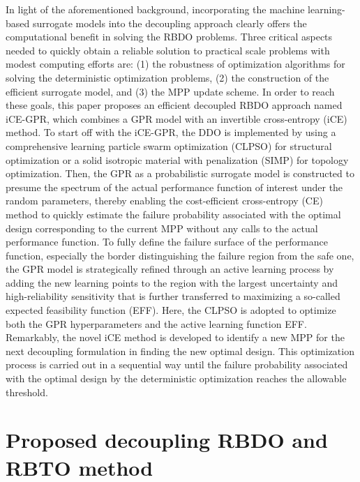 \documentclass[preprint,3p]{elsarticle}
\begin{document}
\begin{linenumbers}
In light of the aforementioned background, incorporating the machine learning-based surrogate models into the decoupling approach clearly offers the computational benefit in solving the RBDO problems. Three critical aspects needed to quickly obtain a reliable solution to practical scale problems with modest computing efforts are: (1) the robustness of optimization algorithms for solving the deterministic optimization problems, (2) the construction of the efficient surrogate model, and (3) the MPP update scheme. In order to reach these goals, this paper proposes an efficient decoupled RBDO approach named iCE-GPR, which combines a GPR model with an invertible cross-entropy (iCE) method. To start off with the iCE-GPR, the DDO is implemented by using a comprehensive learning particle swarm optimization (CLPSO) for structural optimization or a solid isotropic material with penalization (SIMP) for topology optimization. Then, the GPR as a probabilistic surrogate model is constructed to presume the spectrum of the actual performance function of interest under the random parameters, thereby enabling the cost-efficient cross-entropy (CE) method to quickly estimate the failure probability associated with the optimal design corresponding to the current MPP without any calls to the actual performance function. To fully define the failure surface of the performance function, especially the border distinguishing the failure region from the safe one, the GPR model is strategically refined through an active learning process by adding the new learning points to the region with the largest uncertainty and high-reliability sensitivity that is further transferred to maximizing a so-called expected feasibility function (EFF). Here, the CLPSO is adopted to optimize both the GPR hyperparameters and the active learning function EFF. Remarkably, the novel iCE method is developed to identify a new MPP for the next decoupling formulation in finding the new optimal design. This optimization process is carried out in a sequential way until the failure probability associated with the optimal design by the deterministic optimization reaches the allowable threshold. 

\section{Proposed decoupling RBDO and RBTO method}
\label{sec2}


\end{linenumbers}
\end{document}
